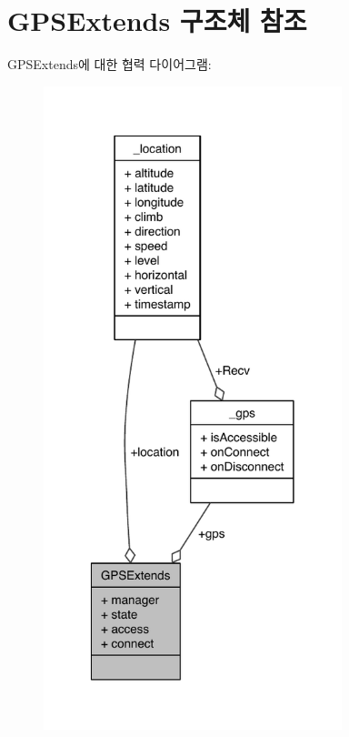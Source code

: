 \hypertarget{struct_g_p_s_extends}{\section{G\-P\-S\-Extends 구조체 참조}
\label{struct_g_p_s_extends}
}


G\-P\-S\-Extends에 대한 협력 다이어그램\-:\nopagebreak
\begin{figure}[H]
\begin{center}
\leavevmode
\includegraphics[width=246pt]{struct_g_p_s_extends__coll__graph}
\end{center}
\end{figure}
